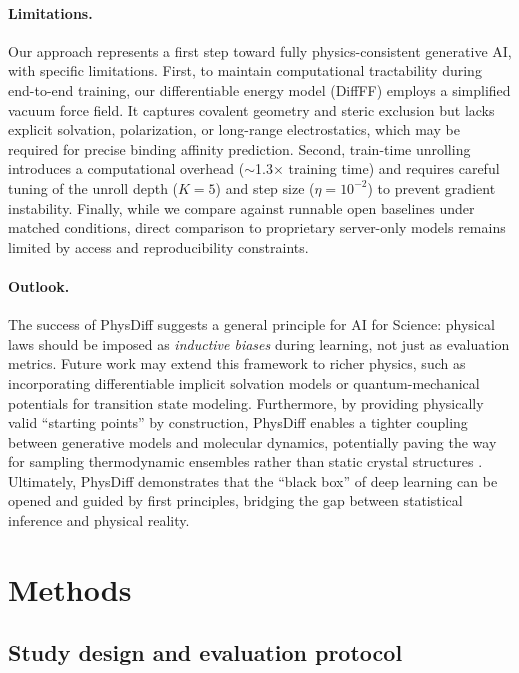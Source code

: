 \documentclass[twocolumn,10pt]{article}
\newcommand{\modelname}{PhysDiff}
\begin{document}
\paragraph{Limitations.}
Our approach represents a first step toward fully physics-consistent generative AI, with specific limitations.
First, to maintain computational tractability during end-to-end training, our differentiable energy model (DiffFF) employs a simplified vacuum force field. It captures covalent geometry and steric exclusion but lacks explicit solvation, polarization, or long-range electrostatics, which may be required for precise binding affinity prediction.
Second, train-time unrolling introduces a computational overhead ($\sim$1.3$\times$ training time) and requires careful tuning of the unroll depth ($K=5$) and step size ($\eta=10^{-2}$) to prevent gradient instability.
Finally, while we compare against runnable open baselines under matched conditions, direct comparison to proprietary server-only models remains limited by access and reproducibility constraints.

\paragraph{Outlook.}
The success of \modelname{} suggests a general principle for AI for Science: physical laws should be imposed as \emph{inductive biases} during learning, not just as evaluation metrics.
Future work may extend this framework to richer physics, such as incorporating differentiable implicit solvation models or quantum-mechanical potentials for transition state modeling.
Furthermore, by providing physically valid ``starting points'' by construction, \modelname{} enables a tighter coupling between generative models and molecular dynamics, potentially paving the way for sampling thermodynamic ensembles rather than static crystal structures \cite{noe2019boltzmann}.
Ultimately, \modelname{} demonstrates that the ``black box'' of deep learning can be opened and guided by first principles, bridging the gap between statistical inference and physical reality.

\section{Methods}\label{sec4}

\subsection{Study design and evaluation protocol}
\end{document}
